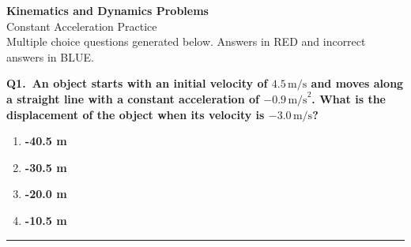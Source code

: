\documentclass[11pt]{article}
\newcommand{\QuestionStyle}[1]{{\large\bfseries\boldmath #1}}
\newcommand{\AnswerStyle}[1]{{\large\bfseries\boldmath #1}}
\newcommand{\ReasonStyle}[1]{{\normalsize #1}}
\newif\ifshowreason
\newcommand{\Correct}[2]{%
  \item \AnswerStyle{\textcolor{AnsRed}{#1}}%
  \ifshowreason\\[-0.2em]
    \ReasonStyle{\textcolor{AnsRed}{#2}}%
  \fi
}
\newcommand{\Wrong}[2]{%
  \item \AnswerStyle{\textcolor{WrongBlue}{#1}}%
  \ifshowreason\\[-0.2em]
    \ReasonStyle{\textcolor{WrongBlue}{#2}}%
  \fi
}
\newcommand{\QBlock}[3]{%
  \Needspace{8\baselineskip}%
  \noindent
  \begin{minipage}{\linewidth}
    \QuestionStyle{#1.~#2}

    \vspace{0.25em}
    \begin{enumerate}
      #3
    \end{enumerate}

    \vspace{0.25em}
    \hrule height 0.4pt
  \end{minipage}
  \vspace{0.75em}
}
\begin{document}
\begin{center}
{\huge \textbf{Kinematics and Dynamics Problems}}\\[0.25em]
{\Large Constant Acceleration Practice}\\[0.25em]
{\large Multiple choice questions generated below. Answers in RED and incorrect answers in BLUE.}
\end{center}

\vspace{0.75em}

\QBlock{Q1}{An object starts with an initial velocity of $4.5\,\text{m/s}$ and moves along a straight line with a constant acceleration of $-0.9\,\text{m/s}^2$. What is the displacement of the object when its velocity is $-3.0\,\text{m/s}$?}{
  \Correct{-40.5 m}{To find the displacement, use the kinematic equation $v^2 = u^2 + 2as$, where $v$ is the final velocity, $u$ is the initial velocity, $a$ is the acceleration, and $s$ is the displacement. \n Here, $v = -3.0\,\text{m/s}$, $u = 4.5\,\text{m/s}$, and $a = -0.9\,\text{m/s}^2$.\n Solving for $s$, we have $(-3.0)^2 = (4.5)^2 + 2*(-0.9)*s$.\n This simplifies to $9 = 20.25 - 1.8s$, leading to $1.8s = 11.25$, thus $s = -40.5\,\text{m}$.\n The negative sign indicates displacement in the opposite direction of the initial velocity.}
  \Wrong{-30.5 m}{This choice results from wrongly adding the squares of the velocities, as in $(v+u)^2=0.5a^2s$.}
  \Wrong{-20.0 m}{This choice uses half the acceleration value, a common error thinking initial acceleration is different from constant acceleration.}
  \Wrong{-10.5 m}{This choice arises from incorrectly applying the equation $v = u + at$ instead of using the kinematic equation involving displacement.}
}
\end{document}
